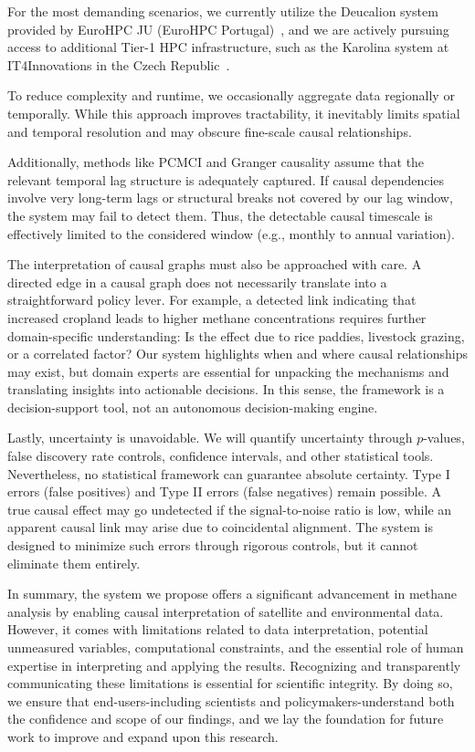 For the most demanding scenarios, we currently utilize the Deucalion system provided by EuroHPC JU (EuroHPC Portugal)~\cite{eurohpc-deucalion}, and we are actively pursuing access to additional Tier-1 HPC infrastructure, such as the Karolina system at IT4Innovations in the Czech Republic~\cite{it4i-karolina}.

To reduce complexity and runtime, we occasionally aggregate data regionally or temporally. While this approach improves tractability, it inevitably limits spatial and temporal resolution and may obscure fine-scale causal relationships.


Additionally, methods like PCMCI and Granger causality assume that the relevant temporal lag structure is adequately captured. If causal dependencies involve very long-term lags or structural breaks not covered by our lag window, the system may fail to detect them. Thus, the detectable causal timescale is effectively limited to the considered window (e.g., monthly to annual variation).

The interpretation of causal graphs must also be approached with care. A directed edge in a causal graph does not necessarily translate into a straightforward policy lever. For example, a detected link indicating that increased cropland leads to higher methane concentrations requires further domain-specific understanding: Is the effect due to rice paddies, livestock grazing, or a correlated factor? Our system highlights when and where causal relationships may exist, but domain experts are essential for unpacking the mechanisms and translating insights into actionable decisions. In this sense, the framework is a decision-support tool, not an autonomous decision-making engine.

Lastly, uncertainty is unavoidable. We will quantify uncertainty through $p$-values, false discovery rate controls, confidence intervals, and other statistical tools. Nevertheless, no statistical framework can guarantee absolute certainty. Type I errors (false positives) and Type II errors (false negatives) remain possible. A true causal effect may go undetected if the signal-to-noise ratio is low, while an apparent causal link may arise due to coincidental alignment. The system is designed to minimize such errors through rigorous controls, but it cannot eliminate them entirely.

In summary, the system we propose offers a significant advancement in methane analysis by enabling causal interpretation of satellite and environmental data. However, it comes with limitations related to data interpretation, potential unmeasured variables, computational constraints, and the essential role of human expertise in interpreting and applying the results. Recognizing and transparently communicating these limitations is essential for scientific integrity. By doing so, we ensure that end-users-including scientists and policymakers-understand both the confidence and scope of our findings, and we lay the foundation for future work to improve and expand upon this research.




